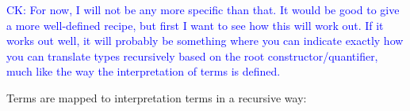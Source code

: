 \documentclass[runningheads,a4paper]{llncs}
\newcommand{\TypeConstructors}{\mathcal{C}}
\newcommand{\TypeQuantifiers}{\mathcal{Q}}
\newcommand{\Typemap}{\mathcal{T\!M}}
\newcommand{\quant}[2]{\forall #1[#2]}
\newcommand{\qquant}[3]{#1 #2[#3]}
\newcommand{\arrtype}{\Rightarrow}
\newcommand{\FTV}{\mathit{FTV}}
\newcommand{\con}{\mathtt{c}}
\newcommand{\CK}[1]{\textcolor{blue}{CK: #1}}
\begin{document}
\begin{definition}
\CK{For now, I will not be any more specific than that.  It would be
  good to give a more well-defined recipe, but first I want to see how
  this will work out.  If it works out well, it will probably be
  something where you can indicate exactly how you can translate types
  recursively based on the root constructor/quantifier, much like the
  way the interpretation of terms is defined.}
%
\end{definition}

Terms are mapped to interpretation terms in a recursive way:
\end{document}
